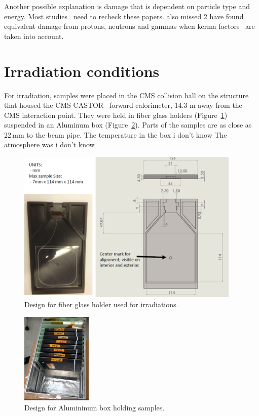 \documentclass[review]{elsarticle}
\begin{document}
Another possible explanation is damage that is dependent on particle
type and energy.
Most studies~\cite{34504,467829,Bodmann2003495,Bodmann2001299}
{\color{red} need to recheck these papers.  also missed 2}
have found equivalent damage from protons, neutrons and gammas
when kerma factors~\cite{kerma} are taken into account.


\section{Irradiation conditions}
\label{sec:radiation}

For irradiation,
samples were placed in the CMS collision hall
on the structure that housed the CMS CASTOR~\cite{castor}
forward calorimeter, 14.3 m away from the CMS interaction point.
They were held in fiber glass holders (Figure~\ref{fig:sampleholder})
suspended in an Aluminum box (Figure~\ref{fig:hangbox}).
Parts of the samples are as close as 22\,mm
to the beam pipe.
The temperature in the box {\color{red} i don't know}
The atmosphere was  {\color{red} i don't know}

\begin{figure}[!ht]
\begin{center}
  \includegraphics[width=0.95\textwidth]{./figures/samplemount.pdf}
\caption{Design for fiber glass holder used for irradiations.
}
\label{fig:sampleholder}
\end{center}
\end{figure}


\begin{figure}[!ht]
\begin{center}
  \includegraphics[width=0.3\textwidth]{./figures/hanging.pdf}
\caption{Design for Alumininum box holding samples.
}
\label{fig:hangbox}
\end{center}
\end{figure}
\end{document}

